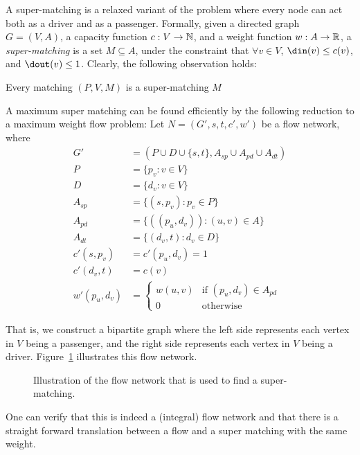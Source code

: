 A super-matching is a relaxed variant of the \CARPOOL{} problem 
where every node can act both as a driver and as a passenger. 
Formally, given a directed graph $G = (V, A)$, 
a capacity function $ c: V \rightarrow \mathbb{N} $,
and a weight function $w : A \rightarrow \mathbb{R}$,
a \emph{super-matching} is a set $M \subseteq A$, 
under the constraint that $\forall v \in V$,
$\din(v) \leq c(v)$, and $\dout(v) \leq 1$. 
%
Clearly, the following observation holds:
\begin{observation}
\label{ob:matching is super}
Every matching $(P, V, M)$ is a super-matching $M$
\end{observation}

A maximum super matching can be found efficiently by the following reduction 
to a maximum weight flow problem: 
Let $N = (G', s, t, c', w')$ be a flow network, where 
\begin{align*}
G'				& = (P \cup D \cup \{s, t\}, A_{sp} \cup A_{pd} \cup A_{dt})	\\
P				& = \{p_v : v \in V\}					\\
D				& = \{d_v : v \in V\}					\\
A_{sp}			& = \{ (s, p_v) : p_v \in P \}			\\
A_{pd}			& = \{ ((p_u, d_v)) : (u, v) \in A \}	\\
A_{dt}			& = \{ (d_v, t) : d_v \in D \}			\\
c'(s, p_v)		& = c'(p_u, d_v) = 1					\\
c'(d_v, t)		& = c(v)								\\
w'(p_u, d_v)	& = 
\begin{cases}
w(u, v) & \text{if } (p_u, d_v) \in A_{pd} \\
0 & \text{otherwise}	
\end{cases}
\end{align*}

That is, 
we construct a bipartite graph where the left side represents each vertex 
in $V$ being a passenger,
and the right side represents each vertex in $V$ being a driver.
Figure~\ref{fig:cm-flow} illustrates this flow network.
%
\begin{figure}
\centering
{}
\caption{
\label{fig:cm-flow}
Illustration of the flow network that is used to find a super-matching.
}
\end{figure}
%
One can verify that this is indeed a (integral) flow network and that there is a
straight forward translation between a flow and a super matching with the same weight.
